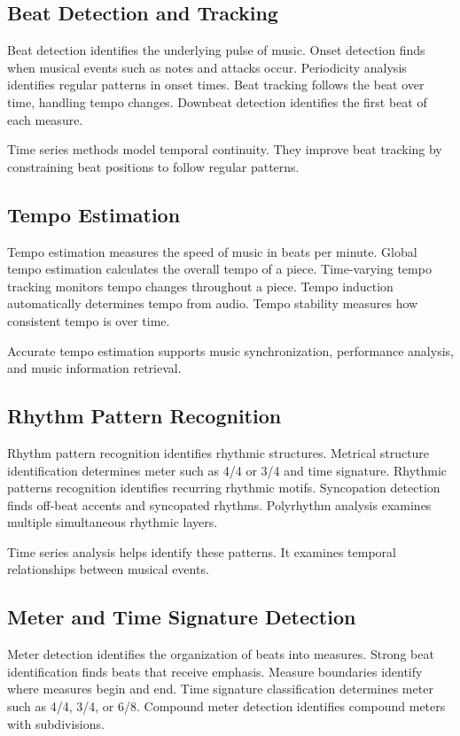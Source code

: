 \subsection{Beat Detection and Tracking}

Beat detection identifies the underlying pulse of music. Onset detection finds when musical events such as notes and attacks occur. Periodicity analysis identifies regular patterns in onset times. Beat tracking follows the beat over time, handling tempo changes. Downbeat detection identifies the first beat of each measure.

Time series methods model temporal continuity. They improve beat tracking by constraining beat positions to follow regular patterns.

\subsection{Tempo Estimation}

Tempo estimation measures the speed of music in beats per minute. Global tempo estimation calculates the overall tempo of a piece. Time-varying tempo tracking monitors tempo changes throughout a piece. Tempo induction automatically determines tempo from audio. Tempo stability measures how consistent tempo is over time.

Accurate tempo estimation supports music synchronization, performance analysis, and music information retrieval.

\subsection{Rhythm Pattern Recognition}

Rhythm pattern recognition identifies rhythmic structures. Metrical structure identification determines meter such as 4/4 or 3/4 and time signature. Rhythmic patterns recognition identifies recurring rhythmic motifs. Syncopation detection finds off-beat accents and syncopated rhythms. Polyrhythm analysis examines multiple simultaneous rhythmic layers.

Time series analysis helps identify these patterns. It examines temporal relationships between musical events.

\subsection{Meter and Time Signature Detection}

Meter detection identifies the organization of beats into measures. Strong beat identification finds beats that receive emphasis. Measure boundaries identify where measures begin and end. Time signature classification determines meter such as 4/4, 3/4, or 6/8. Compound meter detection identifies compound meters with subdivisions.

